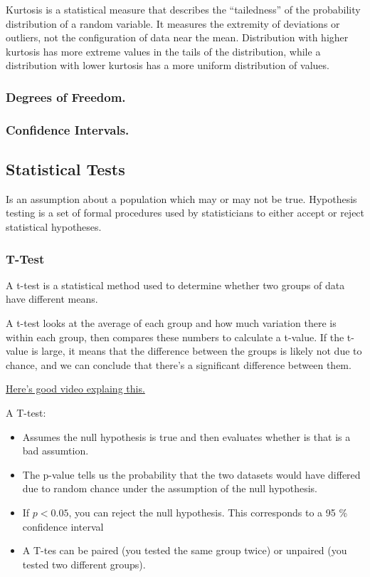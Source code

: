 \documentclass[11pt]{article}
\begin{document}
Kurtosis is a statistical measure that describes the ``tailedness'' of
the probability distribution of a random variable. It measures the
extremity of deviations or outliers, not the configuration of data near
the mean. Distribution with higher kurtosis has more extreme values in
the tails of the distribution, while a distribution with lower kurtosis
has a more uniform distribution of values.

\hypertarget{degrees-of-freedom.}{%
\subsubsection{Degrees of
Freedom.}\label{degrees-of-freedom.}}

\hypertarget{confidence-intervals.}{%
\subsubsection{Confidence Intervals.}\label{confidence-intervals.}}

\hypertarget{statistical-tests}{%
\subsection{Statistical Tests}\label{statistical-tests}}

Is an assumption about a population which may or may not be true.
Hypothesis testing is a set of formal procedures used by statisticians
to either accept or reject statistical hypotheses.

\hypertarget{t-test}{%
\subsubsection{T-Test}\label{t-test}}

A t-test is a statistical method used to determine whether two groups of
data have different means.

A t-test looks at the average of each group and how much variation there
is within each group, then compares these numbers to calculate a
t-value. If the t-value is large, it means that the difference between
the groups is likely not due to chance, and we can conclude that there's
a significant difference between them.

\href{https://www.youtube.com/watch?v=2ARvj-8tJBs}{Here's good video explaing this.}

A T-test: 
\begin{itemize}
  \item Assumes the null hypothesis is true and then evaluates whether is that is a bad assumtion.
  \item The p-value tells us the probability that the two datasets would have differed
        due to random chance under the assumption of the null hypothesis.
  \item If \(p < 0.05\), you can reject the null hypothesis. This corresponds to a 95 \% confidence interval
  \item A T-tes can be paired (you tested the same group twice) or unpaired (you tested two different groups).
\end{itemize}
\end{document}
